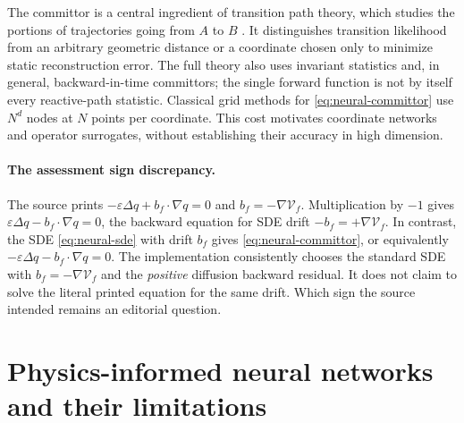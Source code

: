 \documentclass[12pt,a4paper,oneside]{book}
\begin{document}
The committor is a central ingredient of transition path theory, which studies the portions of trajectories going from
$A$ to $B$ \cite{e2006transition}. It distinguishes transition likelihood from an arbitrary geometric distance or a
coordinate chosen only to minimize static reconstruction error. The full theory also uses invariant statistics and,
in general, backward-in-time committors; the single forward function is not by itself every reactive-path statistic.
Classical grid methods for \eqref{eq:neural-committor} use $N^d$ nodes at $N$ points per coordinate.
This cost motivates coordinate networks and operator surrogates, without establishing their accuracy in high dimension.

\paragraph{The assessment sign discrepancy.}
The source prints $-\varepsilon\Delta q+b_f\cdot\nabla q=0$ and $b_f=-\nabla\mathcal V_f$.
Multiplication by $-1$ gives $\varepsilon\Delta q-b_f\cdot\nabla q=0$, the backward equation for SDE drift
$-b_f=+\nabla\mathcal V_f$. In contrast, the SDE \eqref{eq:neural-sde} with drift $b_f$ gives
\eqref{eq:neural-committor}, or equivalently $-\varepsilon\Delta q-b_f\cdot\nabla q=0$.
The implementation consistently chooses the standard SDE with $b_f=-\nabla\mathcal V_f$ and the \emph{positive}
diffusion backward residual. It does not claim to solve the literal printed equation for the same drift.
Which sign the source intended remains an editorial question.

\section{Physics-informed neural networks and their limitations}
\label{subsec:neural-pinn}
\end{document}
